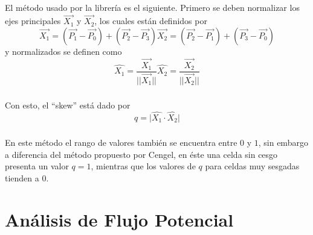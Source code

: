 \documentclass[letterpaper, openright, 12pt]{book}
\begin{document}
    \paragraph*{}
    El método usado por la librería es el siguiente. Primero se deben normalizar
    los ejes principales $\vec{X_1}$ y $\vec{X_2}$, los cuales están definidos
    por
    \begin{subequations}
    \begin{equation}
      \vec{X_1} = (\vec{P_1} - \vec{P_0}) + (\vec{P_2} - \vec{P_3})
    \end{equation}
    \begin{equation}
      \vec{X_2} = (\vec{P_2} - \vec{P_1}) + (\vec{P_3} - \vec{P_0})
    \end{equation}
    \end{subequations}
    y normalizados se definen como
    \begin{subequations}
      \begin{equation}
        \hat{X_1} = \frac{\vec{X_1}}{\lvert\lvert\vec{X_1}\rvert\rvert}
      \end{equation}
      \begin{equation}
        \hat{X_2} = \frac{\vec{X_2}}{\lvert\lvert\vec{X_2}\rvert\rvert}
      \end{equation}
    \end{subequations}

    \paragraph*{}
    Con esto, el ``skew'' está dado por
    \begin{equation}
      q = \lvert \hat{X_1} \cdot \hat{X_2} \rvert
    \end{equation}

    \paragraph*{}
    En este método el rango de valores también se encuentra entre $0$ y $1$,
    sin embargo a diferencia del método propuesto por Cengel, en éste una celda
    sin cesgo presenta un valor $q = 1$, mientras que los valores de $q$ para
    celdas muy sesgadas tienden a $0$.

%
%
%
%
%

\chapter{Análisis de Flujo Potencial}\label{chap:potential}
\end{document}
